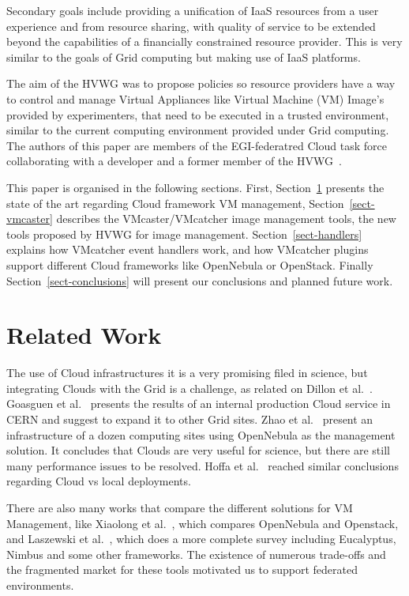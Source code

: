 \documentclass{cai}
\begin{document}
Secondary goals include providing a unification of IaaS resources from a user experience and from resource sharing, with quality of service to be extended beyond the capabilities of a financially constrained resource provider.
This is very similar to the goals of Grid computing but making use of IaaS platforms.

The aim of the HVWG was to propose policies so resource providers have a way to control and manage Virtual Appliances like Virtual Machine (VM) Image's provided by experimenters, that need to be executed in a trusted environment, similar to the current computing environment provided under Grid computing. 
The authors of this paper are members of the EGI-federatred Cloud task force collaborating with a developer and a former member of the HVWG~\cite{hepix}.

This paper is organised in the following sections. First, Section~\ref{sect-relatedwork} presents the state of the art regarding Cloud framework VM management, Section~\ref{sect-vmcaster} describes the VMcaster/VMcatcher image management tools, the new tools proposed by HVWG for image management. 
Section~\ref{sect-handlers} explains how VMcatcher event handlers work, and how VMcatcher plugins support different Cloud frameworks like OpenNebula or OpenStack.
Finally Section~\ref{sect-conclusions} will present our conclusions and planned future work.

\section{Related Work}
\label{sect-relatedwork}
The use of Cloud infrastructures it is a very promising filed in science, but integrating Clouds with the Grid is a challenge, as related on Dillon et al.~\cite{Dillon2010}. Goasguen et al.~\cite{Goasguen2012} presents the results of an internal production Cloud service in CERN and suggest to expand it to other Grid sites. Zhao et al.~\cite{Zhao2012} present an infrastructure of a dozen computing sites using OpenNebula as the management solution. It concludes that Clouds are very useful for science, but there are still many performance issues to be resolved. Hoffa et al.~\cite{Hoffa2008} reached similar conclusions regarding Cloud vs local deployments.

There are also many works that compare the different solutions for VM Management, like Xiaolong et al.~\cite{Xiaolong2012}, which compares OpenNebula and Openstack, and Laszewski et al.~\cite{Laszewski2012}, which does a more complete survey including Eucalyptus, Nimbus and some other frameworks. The existence of numerous trade-offs and the fragmented market for these tools motivated us to support federated environments.
\end{document}
